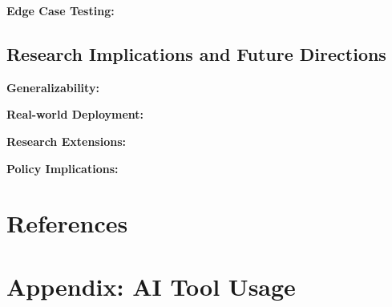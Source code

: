 \documentclass[11pt]{article}
\begin{document}
\textbf{Edge Case Testing:}


\subsection{Research Implications and Future Directions}


\textbf{Generalizability:}


\textbf{Real-world Deployment:}


\textbf{Research Extensions:}


\textbf{Policy Implications:}


\section*{References}


\section*{Appendix: AI Tool Usage}

\end{document}
